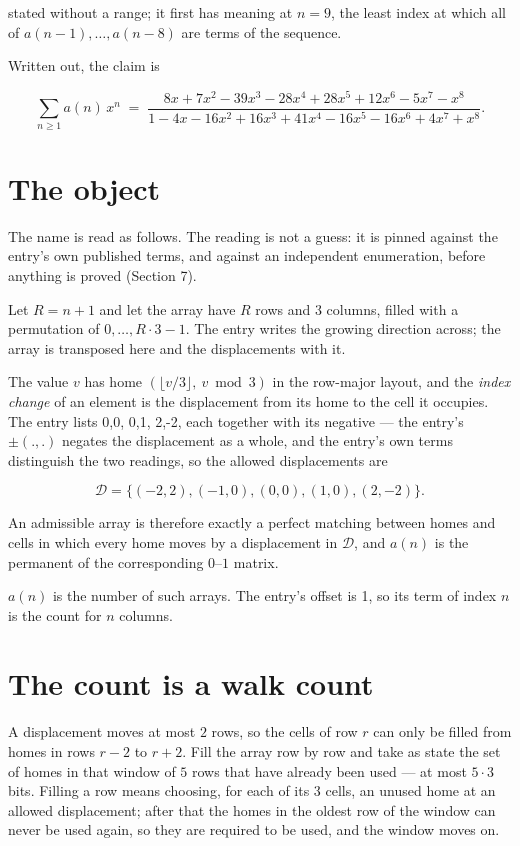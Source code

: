 \documentclass[11pt]{article}
\theoremstyle{definition}
\begin{document}
stated without a range; it first has meaning at $n = 9$, the least index at which all of $a(n-1),\dots,a(n-8)$ are terms of the sequence.

Written out, the claim is

\[\sum_{n \ge 1} a(n)\,x^n \;=\; \frac{8x + 7x^{2} - 39x^{3} - 28x^{4} + 28x^{5} + 12x^{6} - 5x^{7} - x^{8}}{1 - 4x - 16x^{2} + 16x^{3} + 41x^{4} - 16x^{5} - 16x^{6} + 4x^{7} + x^{8}}.\]

\section{The object}

The name is read as follows. The reading is not a guess: it is pinned against the entry's own published terms, and against an independent enumeration, before anything is proved (Section 7).

Let $R = n + 1$ and let the array have $R$ rows and $3$ columns, filled with a permutation of $0,\dots,R\cdot3-1$. The entry writes the growing direction across; the array is transposed here and the displacements with it.

The value $v$ has home $(\lfloor v/3\rfloor,\ v \bmod 3)$ in the row-major layout, and the {\itshape index change} of an element is the displacement from its home to the cell it occupies. The entry lists 0,0, 0,1, 2,-2, each together with its negative --- the entry's $\pm(.,.)$ negates the displacement as a whole, and the entry's own terms distinguish the two readings, so the allowed displacements are

\[\mathcal{D} = \{(-2,2), (-1,0), (0,0), (1,0), (2,-2)\}.\]

An admissible array is therefore exactly a perfect matching between homes and cells in which every home moves by a displacement in $\mathcal{D}$, and $a(n)$ is the permanent of the corresponding $0$--$1$ matrix.

$a(n)$ is the number of such arrays. The entry's offset is 1, so its term of index $n$ is the count for $n$ columns.

\section{The count is a walk count}

A displacement moves at most $2$ rows, so the cells of row $r$ can only be filled from homes in rows $r-2$ to $r+2$. Fill the array row by row and take as state the set of homes in that window of $5$ rows that have already been used --- at most $5\cdot3$ bits. Filling a row means choosing, for each of its $3$ cells, an unused home at an allowed displacement; after that the homes in the oldest row of the window can never be used again, so they are required to be used, and the window moves on.
\end{document}
